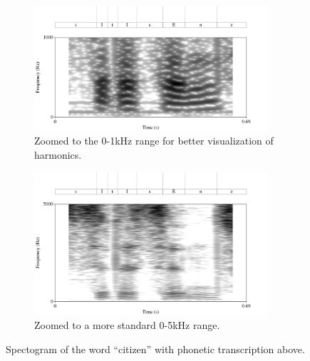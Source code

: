\documentclass[dissertation,copyright]{uathesis}
\begin{document}
\begin{figure}[h!]
\begin{subfigure}{0.95\textwidth}
  \centering
  \includegraphics[width=0.95\textwidth]{figure/spctgrm1k.png}
  \caption{Zoomed to the 0-1kHz range for better visualization of harmonics.}
  \label{fig:spctgrm1k}
\end{subfigure}%
\hfill
\begin{subfigure}{0.95\textwidth}
  \centering
  \includegraphics[width=0.95\textwidth]{figure/spctgrm5k.png}
  \caption{Zoomed to a more standard 0-5kHz range.}
  \label{fig:spctgrm5k}
\end{subfigure}
\caption{Spectogram of the word ``citizen'' with phonetic transcription above.}
\label{fig:spctgrm1k5k}
\end{figure}
\end{document}
